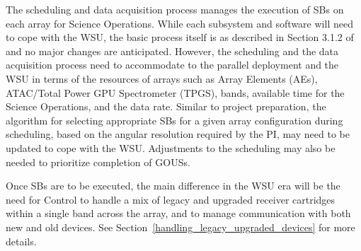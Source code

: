 The scheduling and data acquisition process manages the execution of SBs on each array for Science Operations. While each subsystem and software will need to cope with the WSU, the basic process itself is as described in Section 3.1.2 of~\cite{CSA-IA} and no major changes are anticipated. However, the scheduling and the data acquisition process need to accommodate to the parallel deployment and the WSU in terms of the resources of arrays such as Array Elements (AEs), ATAC/Total Power GPU Spectrometer (TPGS), bands, available time for the Science Operations, and the data rate. Similar to project preparation, the algorithm for selecting appropriate SBs for a given array configuration during scheduling, based on the angular resolution required by the PI, may need to be updated to cope with the WSU. Adjustments to the scheduling may also be needed to prioritize completion of GOUSs. 

Once SBs are to be executed, the main difference in the WSU era will be the need for Control to handle a mix of legacy and upgraded receiver cartridges within a single band across the array, and to manage communication with both new and old devices. See Section~\ref{handling_legacy_upgraded_devices} for more details.


